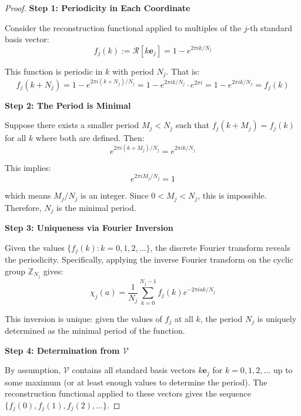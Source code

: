 \begin{proof}

\noindent \textbf{Step 1: Periodicity in Each Coordinate}

Consider the reconstruction functional applied to multiples of the $j$-th standard basis vector:
\begin{equation}
f_j(k) := \mathcal{R}[k \mathbf{e}_j] = 1 - e^{2\pi i k / N_j}
\end{equation}

This function is periodic in $k$ with period $N_j$. That is:
\begin{equation}
f_j(k + N_j) = 1 - e^{2\pi i (k + N_j) / N_j} = 1 - e^{2\pi i k / N_j} \cdot e^{2\pi i} = 1 - e^{2\pi i k / N_j} = f_j(k)
\end{equation}

\noindent \textbf{Step 2: The Period is Minimal}

Suppose there exists a smaller period $M_j < N_j$ such that $f_j(k + M_j) = f_j(k)$ for all $k$ where both are defined. Then:
\begin{equation}
e^{2\pi i (k + M_j) / N_j} = e^{2\pi i k / N_j}
\end{equation}

This implies:
\begin{equation}
e^{2\pi i M_j / N_j} = 1
\end{equation}

which means $M_j / N_j$ is an integer. Since $0 < M_j < N_j$, this is impossible. Therefore, $N_j$ is the minimal period.

\noindent \textbf{Step 3: Uniqueness via Fourier Inversion}

Given the values $\{f_j(k) : k = 0, 1, 2, \ldots\}$, the discrete Fourier transform reveals the periodicity. Specifically, applying the inverse Fourier transform on the cyclic group $\mathbb{Z}_{N_j}$ gives:
\begin{equation}
\chi_j(a) = \frac{1}{N_j} \sum_{k=0}^{N_j - 1} f_j(k) e^{-2\pi i ak / N_j}
\end{equation}

This inversion is unique: given the values of $f_j$ at all $k$, the period $N_j$ is uniquely determined as the minimal period of the function.

\noindent \textbf{Step 4: Determination from $\mathcal{V}$}

By assumption, $\mathcal{V}$ contains all standard basis vectors $k \mathbf{e}_j$ for $k = 0, 1, 2, \ldots$ up to some maximum (or at least enough values to determine the period). The reconstruction functional applied to these vectors gives the sequence $\{f_j(0), f_j(1), f_j(2), \ldots\}$.


\end{proof}
